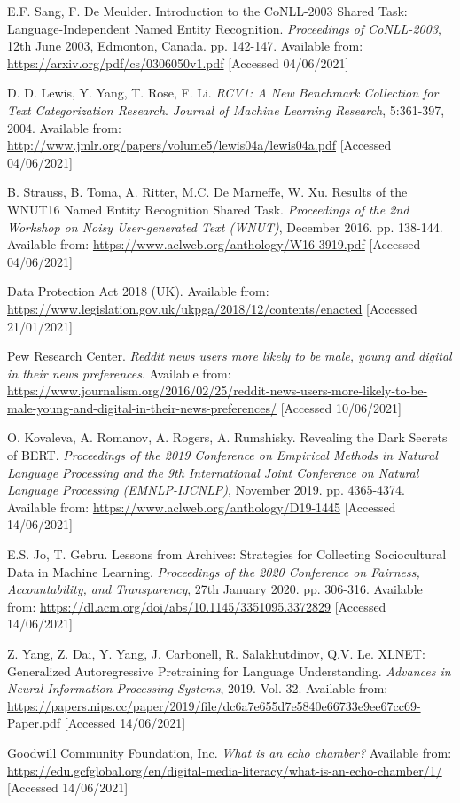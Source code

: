 \begin{thebibliography}{9}
E.F. Sang, F. De Meulder. Introduction to the CoNLL-2003 Shared Task: Language-Independent Named Entity Recognition. \textit{Proceedings of CoNLL-2003}, 12th June 2003, Edmonton, Canada. pp. 142-147. Available from: \url{https://arxiv.org/pdf/cs/0306050v1.pdf} [Accessed 04/06/2021]

D. D. Lewis, Y. Yang, T. Rose, F. Li. \textit{RCV1: A New Benchmark Collection for Text Categorization Research}. \textit{Journal of Machine Learning Research}, 5:361-397, 2004. Available from: \url{http://www.jmlr.org/papers/volume5/lewis04a/lewis04a.pdf} [Accessed 04/06/2021]

B. Strauss, B. Toma, A. Ritter, M.C. De Marneffe, W. Xu. Results of the WNUT16 Named Entity Recognition Shared Task. \textit{Proceedings of the 2nd Workshop on Noisy User-generated Text (WNUT)}, December 2016. pp. 138-144. Available from: \url{https://www.aclweb.org/anthology/W16-3919.pdf} [Accessed 04/06/2021]

Data Protection Act 2018 (UK). Available from: \url{https://www.legislation.gov.uk/ukpga/2018/12/contents/enacted} [Accessed 21/01/2021]

Pew Research Center. \textit{Reddit news users more likely to be male, young and digital in their news preferences}. Available from: \url{https://www.journalism.org/2016/02/25/reddit-news-users-more-likely-to-be-male-young-and-digital-in-their-news-preferences/} [Accessed 10/06/2021]

O. Kovaleva, A. Romanov, A. Rogers, A. Rumshisky. Revealing the Dark Secrets of BERT. \textit{Proceedings of the 2019 Conference on Empirical Methods in Natural Language Processing and the 9th International Joint Conference on Natural Language Processing (EMNLP-IJCNLP)}, November 2019. pp. 4365-4374. Available from: \url{https://www.aclweb.org/anthology/D19-1445} [Accessed 14/06/2021]

E.S. Jo, T. Gebru. Lessons from Archives: Strategies for Collecting Sociocultural Data in Machine Learning. \textit{Proceedings of the 2020 Conference on Fairness, Accountability, and Transparency}, 27th January 2020. pp. 306-316. Available from: \url{https://dl.acm.org/doi/abs/10.1145/3351095.3372829} [Accessed 14/06/2021]

Z. Yang, Z. Dai, Y. Yang, J. Carbonell, R. Salakhutdinov, Q.V. Le. XLNET: Generalized Autoregressive Pretraining for Language Understanding. \textit{Advances in Neural Information Processing Systems}, 2019. Vol. 32. Available from: \url{https://papers.nips.cc/paper/2019/file/dc6a7e655d7e5840e66733e9ee67cc69-Paper.pdf} [Accessed 14/06/2021]

Goodwill Community Foundation, Inc. \textit{What is an echo chamber?} Available from: \url{https://edu.gcfglobal.org/en/digital-media-literacy/what-is-an-echo-chamber/1/} [Accessed 14/06/2021]

\end{thebibliography}